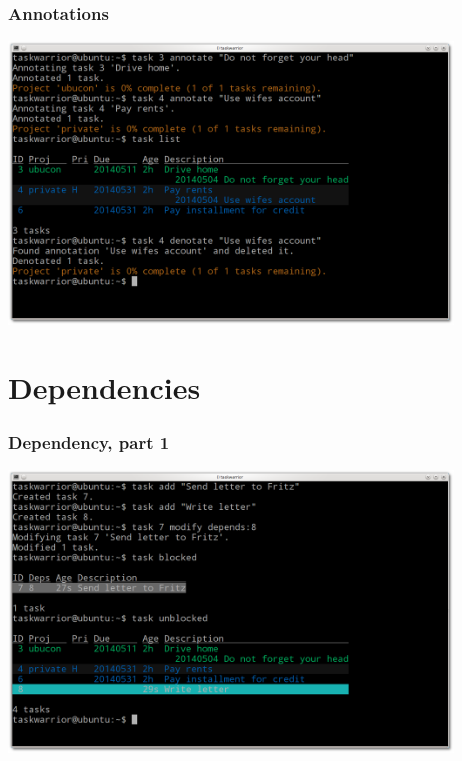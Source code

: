 \documentclass[t,handout]{beamer}
\begin{document}
\begin{frame}[fragile]\frametitle{Annotations}
\begin{center} %
\includegraphics[width=11.8cm,height=7.5cm]{annotations.png}
\end{center}
\end{frame}

\section{Dependencies}

\begin{frame}[fragile]\frametitle{Dependency, part 1}
\begin{center} %
\includegraphics[width=11.8cm,height=7.5cm]{dependency1.png}
\end{center}
\end{frame}
\end{document}
